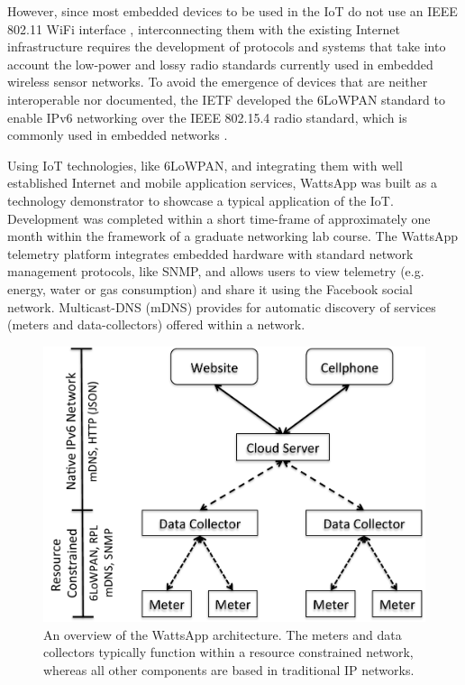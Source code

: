 \documentclass[10pt, conference, compsocconf]{IEEEtran}
\begin{document}
However, since most embedded devices to be used in the IoT do not
use an IEEE 802.11 WiFi interface \cite{durvy08making}, interconnecting
them with the existing Internet infrastructure requires the development
of protocols and systems that take into account the low-power and
lossy radio standards currently used in embedded wireless sensor networks.
To avoid the emergence of devices that are neither interoperable nor documented, the IETF developed the 6LoWPAN standard \cite{rfc-4,rfc-5} to enable IPv6 networking over the IEEE 802.15.4 radio standard, which is commonly used in embedded networks \cite{6lowpan-1}.

Using IoT technologies, like 6LoWPAN, and integrating them with well
established Internet and mobile application services, WattsApp was
built as a technology demonstrator to showcase a typical application
of the IoT. Development was completed within a short time-frame of
approximately one month within the framework of a graduate networking
lab course. The WattsApp telemetry platform integrates embedded hardware
with standard network management protocols, like SNMP, and allows
users to view telemetry (e.g. energy, water or gas consumption) and
share it using the Facebook social network. Multicast-DNS (mDNS) provides
for automatic discovery of services (meters and data-collectors) offered
within a network.

\begin{figure}[t]
\begin{centering}
\includegraphics[scale=0.4]{images/wattsapp-overview} 
\par\end{centering}

\caption{An overview of the WattsApp architecture. The meters and data collectors
typically function within a resource constrained network, whereas
all other components are based in traditional IP networks.\label{fig:wattsapp}}
\end{figure}
\end{document}
